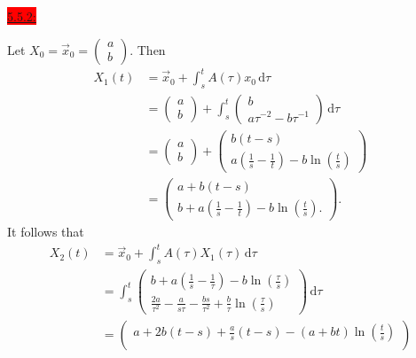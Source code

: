 \documentclass{exam}
\begin{document}
\colorbox{red}{\underline{5.5.2:}}
\begin{solution}
    Let $X_0 = \vec{x}_0 = \left(\begin{smallmatrix} a \\ b \end{smallmatrix}\right)$. Then
    \begin{align*}
        X_1(t) &= \vec{x}_0 + \int_{s}^{t} A(\tau)x_0\,\mathrm{d}\tau \\
        &= \begin{pmatrix}
            a \\ b
        \end{pmatrix}
        + \int_s^t \begin{pmatrix}
            b \\
            a\tau^{-2} - b\tau^{-1}
        \end{pmatrix}\,\mathrm{d}\tau \\
        &= \begin{pmatrix}
            a \\ b
        \end{pmatrix}
        + \begin{pmatrix}
            b(t-s) \\
            a\left(\frac{1}{s} - \frac{1}{t}\right) - b\ln\left(\frac{t}{s}\right)
        \end{pmatrix} \\
        &= \begin{pmatrix}
            a + b(t-s) \\
            b + a\left(\frac{1}{s} - \frac{1}{t}\right) - b\ln\left(\frac{t}{s}\right).
        \end{pmatrix}.
    \end{align*}   
    It follows that 
    \begin{align*}
        X_2(t) &= \vec{x}_0 + \int_s^t A(\tau)X_1(\tau)\,\mathrm{d}\tau \\
        &= \int_s^t \begin{pmatrix}
            b + a\left(\frac{1}{s} - \frac{1}{\tau}\right) - b\ln\left(\frac{\tau}{s}\right) \\
            \frac{2a}{\tau^2} - \frac{a}{s\tau} - \frac{bs}{\tau^{2}} + \frac{b}{\tau}\ln\left(\frac{\tau}{s}\right)
        \end{pmatrix}\,\mathrm{d}\tau \\
        &= \begin{pmatrix}
            a + 2b(t - s) + \frac{a}{s}\left(t-s\right) - (a + bt)\ln\left(\frac{t}{s}\right) \\

\end{pmatrix}
\end{align*}
\end{solution}
\end{document}
